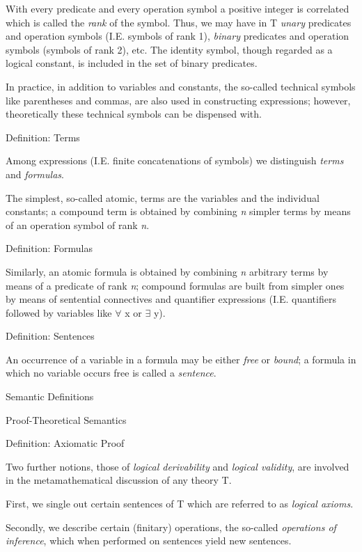 With every predicate and every operation symbol a positive integer is
correlated which is called the \emph{rank} of the symbol. Thus, we may
have in T \emph{unary} predicates and operation symbols (I.E. symbols of
rank 1), \emph{binary} predicates and operation symbols (symbols of rank
2), etc. The identity symbol, though regarded as a logical constant, is
included in the set of binary predicates.

In practice, in addition to variables and constants, the so-called
technical symbols like parentheses and commas, are also used in
constructing expressions; however, theoretically these technical symbols
can be dispensed with.

\protect\hypertarget{anchor-6}{}{}Definition: Terms

Among expressions (I.E. finite concatenations of symbols) we distinguish
\emph{terms} and \emph{formulas}.

The simplest, so-called atomic, terms are the variables and the
individual constants; a compound term is obtained by combining \emph{n}
simpler terms by means of an operation symbol of rank \emph{n}.

\protect\hypertarget{anchor-7}{}{}Definition: Formulas

Similarly, an atomic formula is obtained by combining \emph{n} arbitrary
terms by means of a predicate of rank \emph{n}; compound formulas are
built from simpler ones by means of sentential connectives and
quantifier expressions (I.E. quantifiers followed by variables like $\forall$ x
or $\exists$ y).

\protect\hypertarget{anchor-8}{}{}Definition: Sentences

An occurrence of a variable in a formula may be either \emph{free} or
\emph{bound}; a formula in which no variable occurs free is called a
\emph{sentence}.

\protect\hypertarget{anchor-9}{}{}Semantic Definitions

\protect\hypertarget{anchor-10}{}{}Proof-Theoretical Semantics

\protect\hypertarget{anchor-11}{}{}Definition: Axiomatic Proof

Two further notions, those of \emph{logical derivability} and
\emph{logical validity}, are involved in the metamathematical discussion
of any theory T.

First, we single out certain sentences of T which are referred to as
\emph{logical axioms}.

Secondly, we describe certain (finitary) operations, the so-called
\emph{operations of inference}, which when performed on sentences yield
new sentences.

